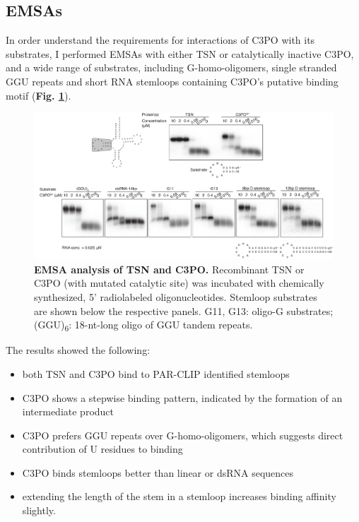 \documentclass[12pt]{rockefeller}
\newcommand{\sub}[1]{\textsubscript{#1}}
\begin{document}
\subsection{EMSAs}

In order understand the requirements for interactions of C3PO with its substrates, I performed \glspl{EMSA} with either TSN or catalytically inactive C3PO, and a wide range of substrates, including G-homo-oligomers, single stranded GGU repeats and short RNA stemloops containing C3PO’s putative binding motif (\textbf{Fig. \ref{emsa}}). 

\begin{figure}[!ht]%
\centering
\includegraphics[width=\textwidth]{emsa.png} 
\caption[EMSA analysis of TSN and C3PO.]
{
\textbf{EMSA analysis of TSN and C3PO.}
Recombinant TSN or C3PO (with mutated catalytic site) was incubated with chemically synthesized, 5' radiolabeled oligonucleotides. Stemloop substrates are shown below the respective panels. G11, G13: oligo-G substrates; (GGU)\sub{6}: 18-nt-long oligo of GGU tandem repeats.
}
\centering
\label{emsa}%
\end{figure}

The results showed the following: 
\begin{itemize}
\item both TSN and C3PO bind to PAR-CLIP identified stemloops 
\item C3PO shows a stepwise binding pattern, indicated by the formation of an intermediate product
\item C3PO prefers GGU repeats over G-homo-oligomers, which suggests direct contribution of U residues to binding 
\item C3PO binds stemloops better than linear or dsRNA sequences
\item extending the length of the stem in a stemloop increases binding affinity slightly.
\end{itemize}
\end{document}
